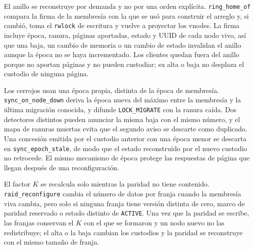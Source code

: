 El anillo se reconstruye por demanda y no por una orden explícita. \texttt{ring\_home\_of} compara la firma de la membresía con la que se usó para construir el arreglo y, si cambió, toma el \texttt{rwlock} de escritura y vuelve a proyectar los vnodes. La firma incluye época, ranura, páginas aportadas, estado y UUID de cada nodo vivo, así que una baja, un cambio de memoria o un cambio de estado invalidan el anillo aunque la época no se haya incrementado. Los clientes quedan fuera del anillo porque no aportan páginas y no pueden custodiar; su alta o baja no desplaza el custodio de ninguna página.

Los cerrojos usan una época propia, distinta de la época de membresía. \texttt{sync\_on\_node\_down} deriva la época nueva del máximo entre la membresía y la última migración conocida, y difunde \texttt{LOCK\_MIGRATE} con la ranura caída. Dos detectores distintos pueden anunciar la misma baja con el mismo número, y el mapa de ranuras muertas evita que el segundo aviso se descarte como duplicado. Una concesión emitida por el custodio anterior con una época menor se descarta en \texttt{sync\_epoch\_stale}, de modo que el estado reconstruido por el nuevo custodio no retrocede. El mismo mecanismo de época protege las respuestas de página que llegan después de una reconfiguración.

El factor $K$ se recalcula solo mientras la paridad no tiene contenido. \texttt{raid\_reconfigure} cambia el número de datos por franja cuando la membresía viva cambia, pero solo si ninguna franja tiene versión distinta de cero, marco de paridad reservado o estado distinto de \texttt{ACTIVE}. Una vez que la paridad se escribe, las franjas conservan el $K$ con el que se formaron y un nodo nuevo no las redistribuye; el alta o la baja cambian los custodios y la paridad se reconstruye con el mismo tamaño de franja.

